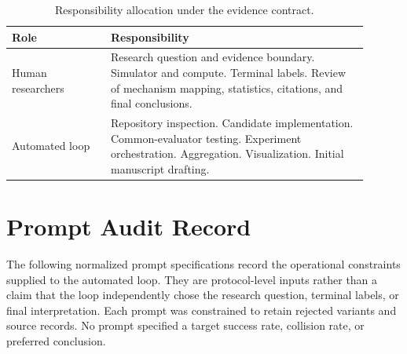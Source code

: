 \documentclass{article}
\begin{document}
\begin{table}[H]
\caption{Responsibility allocation under the evidence contract.}
\label{tab:responsibility}
\centering
\small
\begin{tabular}{L{0.25\linewidth}L{0.65\linewidth}}
\toprule
Role & Responsibility \\
\midrule
Human researchers & Research question and evidence boundary. Simulator and compute. Terminal labels. Review of mechanism mapping, statistics, citations, and final conclusions. \\
Automated loop & Repository inspection. Candidate implementation. Common-evaluator testing. Experiment orchestration. Aggregation. Visualization. Initial manuscript drafting. \\
\bottomrule
\end{tabular}
\end{table}

\section{Prompt Audit Record}

The following normalized prompt specifications record the operational constraints supplied to the automated loop. They are protocol-level inputs rather than a claim that the loop independently chose the research question, terminal labels, or final interpretation. Each prompt was constrained to retain rejected variants and source records. No prompt specified a target success rate, collision rate, or preferred conclusion.
\end{document}
